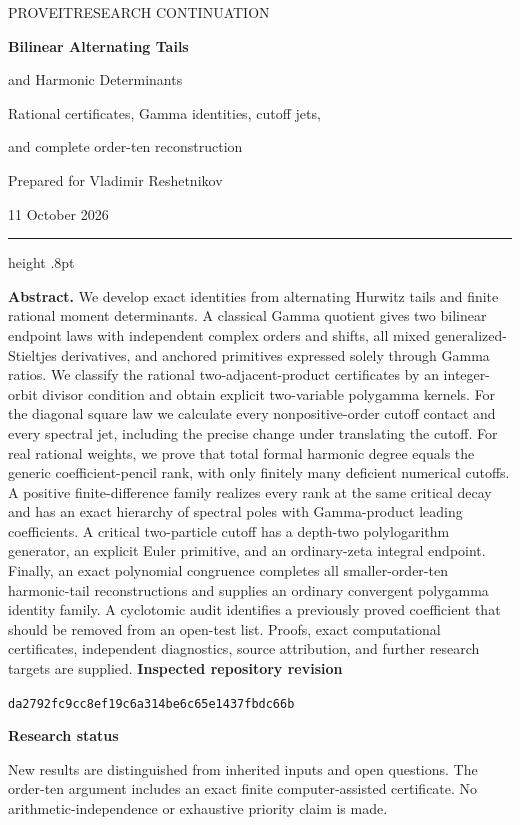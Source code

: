 \documentclass[11pt]{article}
\begin{document}
\begin{titlepage}
\thispagestyle{empty}
\vspace*{8mm}
{\large\color{teal}\sffamily PROVEIT\quad RESEARCH CONTINUATION\par}
\vspace{14mm}
{\Huge\bfseries\color{navy}Bilinear Alternating Tails\par
\vspace{3mm}and Harmonic Determinants\par}
\vspace{8mm}
{\Large Rational certificates, Gamma identities, cutoff jets,\par
\vspace{2mm}and complete order-ten reconstruction\par}
\vspace{10mm}
{\large Prepared for Vladimir Reshetnikov\par}
\vspace{2mm}
{11 October 2026\par}
\vspace{11mm}
{\color{teal}\hrule height .8pt}
\vspace{7mm}
\noindent\textbf{Abstract.}
We develop exact identities from alternating Hurwitz tails and finite
rational moment determinants. A classical Gamma quotient gives two
bilinear endpoint laws with independent complex orders and shifts,
all mixed generalized-Stieltjes derivatives, and anchored primitives
expressed solely through Gamma ratios. We classify the rational
two-adjacent-product certificates by an integer-orbit divisor condition
and obtain explicit two-variable polygamma kernels. For the diagonal
square law we calculate every nonpositive-order cutoff contact and
every spectral jet, including the precise change under translating
the cutoff. For real rational weights, we prove that total formal
harmonic degree equals the generic coefficient-pencil rank, with only
finitely many deficient numerical cutoffs. A positive finite-difference
family realizes every rank at the same critical decay and has an exact
hierarchy of spectral poles with Gamma-product leading coefficients. A critical two-particle
cutoff has a depth-two polylogarithm generator, an explicit Euler
primitive, and an ordinary-zeta integral endpoint. Finally, an exact polynomial congruence completes all smaller-order-ten
harmonic-tail reconstructions and supplies an ordinary convergent
polygamma identity family. A cyclotomic audit identifies a previously
proved coefficient that should be removed from an open-test list.
Proofs, exact computational certificates, independent diagnostics,
source attribution, and further research targets are supplied.
\vfill
\noindent\small
\textbf{Inspected repository revision}\par
\texttt{da2792fc9cc8ef19c6a314be6c65e1437fbdc66b}\par
\vspace{3mm}
\textbf{Research status}\par
New results are distinguished from inherited inputs and open questions.
The order-ten argument includes an exact finite computer-assisted
certificate. No arithmetic-independence or exhaustive priority claim
is made.
\end{titlepage}
\end{document}
